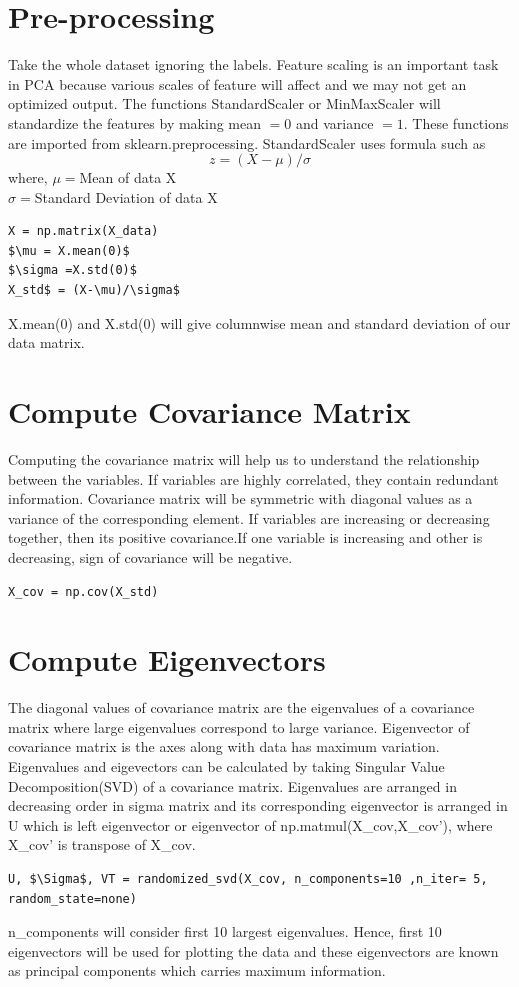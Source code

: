 \documentclass[journal,12pt,twocolumn]{IEEEtran}
\begin{document}
\section{Pre-processing}
Take the whole dataset ignoring the labels. Feature scaling is an important task in PCA because various scales of feature will affect and we may not get an optimized output. The functions  StandardScaler or MinMaxScaler will standardize the features by making mean $=0$ and variance $=1$. These functions are imported from sklearn.preprocessing. 
StandardScaler uses formula such as 
$$ z = (X-\mu)/\sigma$$
where, $\mu = $Mean of data X\\
$\sigma =$Standard Deviation of data X\\

\begin{lstlisting}[mathescape=true]
X = np.matrix(X_data)
$\mu = X.mean(0)$
$\sigma =X.std(0)$
X_std$ = (X-\mu)/\sigma$
\end{lstlisting}

X.mean(0) and X.std(0) will give columnwise mean and standard deviation of our data matrix.

\section{Compute Covariance Matrix}
Computing the covariance matrix will help us to understand the relationship between the variables. If variables are highly correlated, they contain redundant information. Covariance matrix will be symmetric with diagonal values as a variance of the corresponding element. If variables are increasing or decreasing together, then its positive covariance.If one variable is increasing and other is decreasing, sign of covariance will be negative.
 
\begin{lstlisting}[mathescape=true]
X_cov = np.cov(X_std)
\end{lstlisting}

\section{Compute Eigenvectors}
The diagonal values of covariance matrix are the eigenvalues of a covariance matrix where large eigenvalues correspond to large variance. Eigenvector of covariance matrix is the axes along with data has maximum variation. Eigenvalues and eigevectors can be calculated by taking Singular Value Decomposition(SVD) of a covariance matrix. Eigenvalues are arranged in decreasing order in sigma matrix and its corresponding eigenvector is arranged in U which is left eigenvector or eigenvector of np.matmul(X\_cov,X\_cov'), where X\_cov' is transpose of X\_cov.
\begin{lstlisting}[mathescape=true]
U, $\Sigma$, VT = randomized_svd(X_cov, n_components=10 ,n_iter= 5, random_state=none)
\end{lstlisting}
n\_components will consider first 10 largest eigenvalues. Hence, first 10 eigenvectors will be used for plotting the data and these eigenvectors are known as principal components which carries maximum information.
\end{document}

